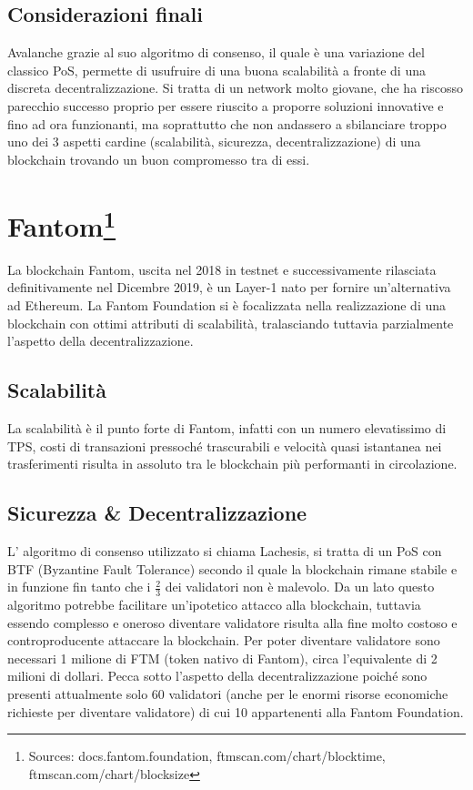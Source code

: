 \documentclass[a4paper, 12pt]{article}
\begin{document}
\subsection*{Considerazioni finali}
Avalanche grazie al suo algoritmo di consenso, il quale è una variazione del classico PoS, permette di usufruire di una buona scalabilità a fronte di una discreta decentralizzazione. Si tratta di un network molto giovane, che ha riscosso parecchio successo proprio per essere riuscito a proporre soluzioni innovative e fino ad ora funzionanti, ma soprattutto che non andassero a sbilanciare troppo uno dei 3 aspetti cardine (scalabilità, sicurezza, decentralizzazione) di una blockchain trovando un buon compromesso tra di essi.
\newpage
\section*{Fantom\footnote{Sources: docs.fantom.foundation, ftmscan.com/chart/blocktime, ftmscan.com/chart/blocksize}}
La blockchain Fantom, uscita nel 2018 in testnet e successivamente rilasciata definitivamente nel Dicembre 2019, è un Layer-1 nato per fornire un'alternativa ad Ethereum.
La Fantom Foundation si è focalizzata nella realizzazione di una blockchain con ottimi attributi di scalabilità, tralasciando tuttavia parzialmente l'aspetto della decentralizzazione.
\subsection*{Scalabilità}
La scalabilità è il punto forte di Fantom, infatti con un numero elevatissimo di TPS, costi di transazioni pressoché trascurabili e velocità quasi istantanea nei trasferimenti risulta in assoluto tra le blockchain più performanti in circolazione.
\subsection*{Sicurezza \& Decentralizzazione}
L' algoritmo di consenso utilizzato si chiama Lachesis, si tratta di un PoS con BTF (Byzantine Fault Tolerance) secondo il quale la blockchain rimane stabile e in funzione fin tanto che i $\frac{2}{3}$ dei validatori non è malevolo.
Da un lato questo algoritmo potrebbe facilitare un'ipotetico attacco alla blockchain, tuttavia essendo complesso e oneroso diventare validatore risulta alla fine molto costoso e controproducente attaccare la blockchain.
Per poter diventare validatore sono necessari 1 milione di FTM (token nativo di Fantom), circa l’equivalente di 2 milioni di dollari.
Pecca sotto l’aspetto della decentralizzazione poiché sono presenti attualmente solo 60 validatori (anche per le enormi risorse economiche richieste per diventare validatore) di cui 10 appartenenti alla Fantom Foundation.
\end{document}
